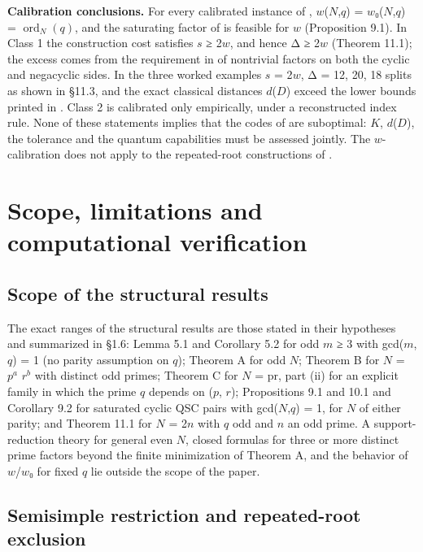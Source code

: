 \documentclass[pdflatex,sn-mathphys-num]{sn-jnl}
\theoremstyle{thmstyleone}
\theoremstyle{thmstylethree}
\begin{document}
\textbf{Calibration conclusions.} For every calibrated instance of \cite{LZ22}, \(w\)(\(N\),\(q\)) = \(w\)₀(\(N\),\(q\)) = \(\operatorname{ord}_N(q)\), and the saturating factor of \cite{LZ22} is feasible for \(w\) (Proposition 9.1). In Class 1 the construction cost satisfies \(s\) ≥ 2\(w\), and hence Δ ≥ 2\(w\) (Theorem 11.1); the excess comes from the requirement in \cite{LZ22} of nontrivial factors on both the cyclic and negacyclic sides. In the three worked examples \(s\) = 2\(w\), Δ = 12, 20, 18 splits as shown in §11.3, and the exact classical distances \(d\)(\(D\)) exceed the lower bounds printed in \cite{LZ22}. Class 2 is calibrated only empirically, under a reconstructed index rule. None of these statements implies that the codes of \cite{LZ22} are suboptimal: \(K\), \(d\)(\(D\)), the tolerance and the quantum capabilities must be assessed jointly. The \(w\)-calibration does not apply to the repeated-root constructions of \cite{DMLHW20}.

\section{Scope, limitations and computational verification}

\subsection{Scope of the structural results}

The exact ranges of the structural results are those stated in their hypotheses and summarized in §1.6: Lemma 5.1 and Corollary 5.2 for odd \(m\) ≥ 3 with gcd(\(m\),\(q\)) = 1 (no parity assumption on \(q\)); Theorem A for odd \(N\); Theorem B for \(N\) = \(p^a\) \(r^b\) with distinct odd primes; Theorem C for \(N\) = pr, part (ii) for an explicit family in which the prime \(q\) depends on (\(p\), \(r\)); Propositions 9.1 and 10.1 and Corollary 9.2 for saturated cyclic QSC pairs with gcd(\(N\),\(q\)) = 1, for \(N\) of either parity; and Theorem 11.1 for \(N\) = 2\(n\) with \(q\) odd and \(n\) an odd prime. A support-reduction theory for general even \(N\), closed formulas for three or more distinct prime factors beyond the finite minimization of Theorem A, and the behavior of \(w\)/\(w\)₀ for fixed \(q\) lie outside the scope of the paper.

\subsection{Semisimple restriction and repeated-root exclusion}
\end{document}
